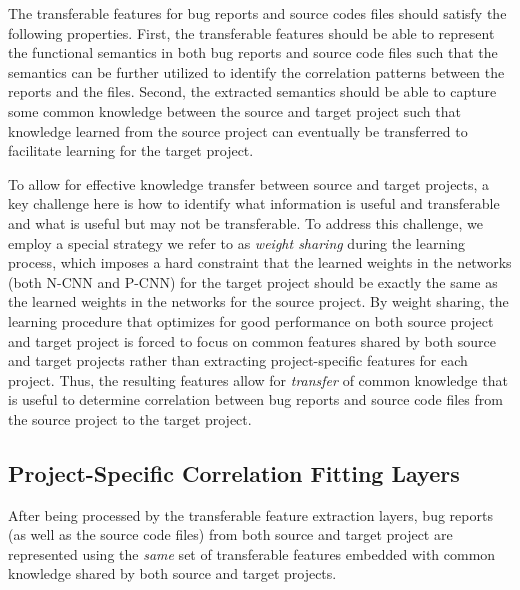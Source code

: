 The transferable features for bug reports and source codes files should satisfy the following properties. First, the transferable features should be able to represent the functional semantics in both bug reports and source code files such that the semantics can be further utilized to identify the correlation patterns between the reports and the files. Second, the extracted semantics should be able to capture some common knowledge between the source and target project such that knowledge learned from the source project can eventually be transferred to facilitate learning for the target project.

To allow for effective knowledge transfer between source and target projects, a key challenge here is how to identify what information is useful and transferable and what is useful but may not be transferable. To address this challenge, we employ a special strategy we refer to as \emph{weight sharing} during the learning process, which imposes a hard constraint that the learned weights in the networks (both N-CNN and P-CNN) for the target project should be exactly the same as the learned weights in the networks for the source project. By weight sharing, the learning procedure that optimizes for good performance on both source project and target project is forced to focus on common features shared by both source and target projects rather than extracting project-specific features for each project. Thus, the resulting features allow for \emph{transfer} of common knowledge that is useful to determine correlation between bug reports and source code files from the source project to the target project.
 


\subsection{Project-Specific Correlation Fitting Layers}

After being processed by the transferable feature extraction layers, bug reports (as well as the source code files) from both source and target project are represented using the \emph{same} set of transferable features embedded with common knowledge shared by both source and target projects.


